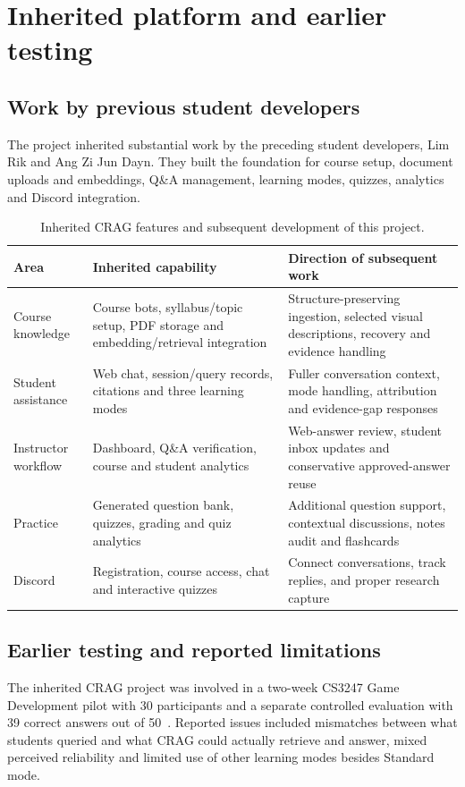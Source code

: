 \chapter{Inherited platform and earlier testing}
\section{Work by previous student developers}
The project inherited substantial work by the preceding student developers, Lim Rik and Ang Zi Jun Dayn. They built the foundation for course setup, document uploads and embeddings, Q\&A management, learning modes, quizzes, analytics and Discord integration.

\begin{table}[htbp]
\centering\small
\caption{Inherited CRAG features and subsequent development of this project.}
\begin{tabularx}{\textwidth}{@{}P{0.23\textwidth}YY@{}}
\toprule
Area & Inherited capability & Direction of subsequent work\\
\midrule
Course knowledge & Course bots, syllabus/topic setup, PDF storage and embedding/retrieval integration & Structure-preserving ingestion, selected visual descriptions, recovery and evidence handling\\
Student assistance & Web chat, session/query records, citations and three learning modes & Fuller conversation context, mode handling, attribution and evidence-gap responses\\
Instructor workflow & Dashboard, Q\&A verification, course and student analytics & Web-answer review, student inbox updates and conservative approved-answer reuse\\
Practice & Generated question bank, quizzes, grading and quiz analytics & Additional question support, contextual discussions, notes audit and flashcards\\
Discord & Registration, course access, chat and interactive quizzes & Connect conversations, track replies, and proper research capture\\
\bottomrule
\end{tabularx}
\end{table}

\section{Earlier testing and reported limitations}
The inherited CRAG project was involved in a two-week CS3247 Game Development pilot with 30 participants and a separate controlled evaluation with 39 correct answers out of 50~\parencite{cragpaper}. Reported issues included mismatches between what students queried and what CRAG could actually retrieve and answer, mixed perceived reliability and limited use of other learning modes besides Standard mode.


